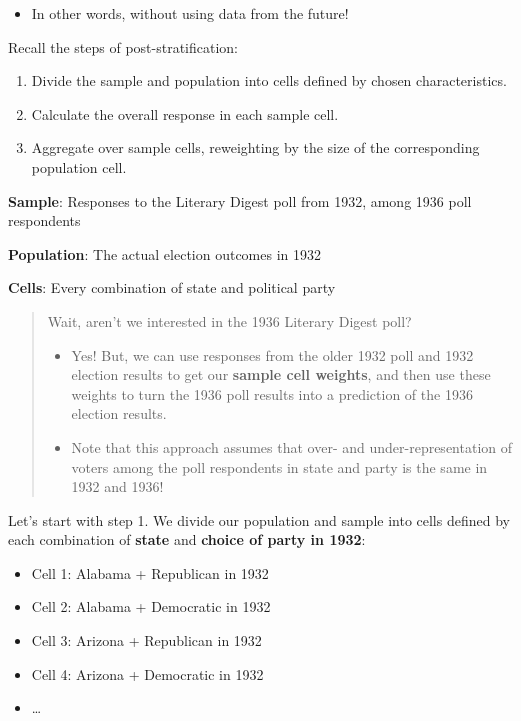 \documentclass[
  letterpaper,
  DIV=11,
  numbers=noendperiod]{scrreprt}
\providecommand{\tightlist}{%
  \setlength{\itemsep}{0pt}\setlength{\parskip}{0pt}}\usepackage{longtable,booktabs,array}
\begin{document}
\begin{itemize}
\tightlist
\item
  In other words, without using data from the future!
\end{itemize}

Recall the steps of post-stratification:

\begin{enumerate}
\def\labelenumi{\arabic{enumi}.}
\tightlist
\item
  Divide the sample and population into cells defined by chosen
  characteristics.
\item
  Calculate the overall response in each sample cell.
\item
  Aggregate over sample cells, reweighting by the size of the
  corresponding population cell.
\end{enumerate}

\textbf{Sample}: Responses to the Literary Digest poll from 1932, among
1936 poll respondents

\textbf{Population}: The actual election outcomes in 1932

\textbf{Cells}: Every combination of state and political party

\begin{quote}
Wait, aren't we interested in the 1936 Literary Digest poll?

\begin{itemize}
\item
  Yes! But, we can use responses from the older 1932 poll and 1932
  election results to get our \textbf{sample cell weights}, and then use
  these weights to turn the 1936 poll results into a prediction of the
  1936 election results.
\item
  Note that this approach assumes that over- and under-representation of
  voters among the poll respondents in state and party is the same in
  1932 and 1936!
\end{itemize}
\end{quote}

Let's start with step 1. We divide our population and sample into cells
defined by each combination of \textbf{state} and \textbf{choice of
party in 1932}:

\begin{itemize}
\tightlist
\item
  Cell 1: Alabama + Republican in 1932
\item
  Cell 2: Alabama + Democratic in 1932
\item
  Cell 3: Arizona + Republican in 1932
\item
  Cell 4: Arizona + Democratic in 1932
\item
  \ldots{}
\end{itemize}
\end{document}
